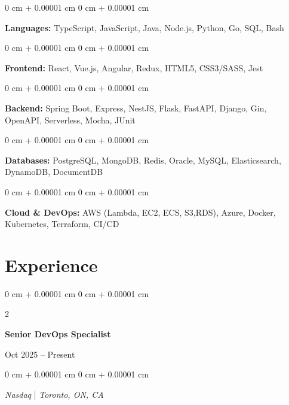\documentclass[11pt, letterpaper]{article}
\newenvironment{onecolentry}{
\begin{adjustwidth}{
0 cm + 0.00001 cm
}{
0 cm + 0.00001 cm
}
}{
\end{adjustwidth}
} %
\newenvironment{twocolentry}[2][]{
\onecolentry
\def\secondColumn{#2}
\setcolumnwidth{\fill, 4.5 cm}
\begin{paracol}{2}
}{
\switchcolumn \raggedleft \secondColumn
\end{paracol}
\endonecolentry
} %
\begin{document}
\begin{onecolentry}
\textbf{Languages:} TypeScript, JavaScript, Java, Node.js, Python, Go, SQL, Bash
\end{onecolentry}

\vspace{0.05 cm}
\begin{onecolentry}
\textbf{Frontend:} React, Vue.js, Angular, Redux, HTML5, CSS3/SASS, Jest
\end{onecolentry}

\vspace{0.05 cm}
\begin{onecolentry}
\textbf{Backend:} Spring Boot, Express, NestJS, Flask, FastAPI, Django, Gin, OpenAPI, Serverless, Mocha, JUnit
\end{onecolentry}
\vspace{0.05 cm}
\begin{onecolentry}
\textbf{Databases:} PostgreSQL, MongoDB, Redis, Oracle, MySQL, Elasticsearch, DynamoDB, DocumentDB
\end{onecolentry}

\vspace{0.05 cm}
\begin{onecolentry}
\textbf{Cloud \& DevOps:} AWS (Lambda, EC2, ECS, S3,RDS), Azure, Docker, Kubernetes, Terraform, CI/CD
\end{onecolentry}

\section{Experience}

\begin{twocolentry}{
Oct 2025 – Present
}
\textbf{Senior DevOps Specialist}
\end{twocolentry}

\begin{onecolentry}
\textit{Nasdaq} | \textit{Toronto, ON, CA}
\end{onecolentry}
\end{document}
